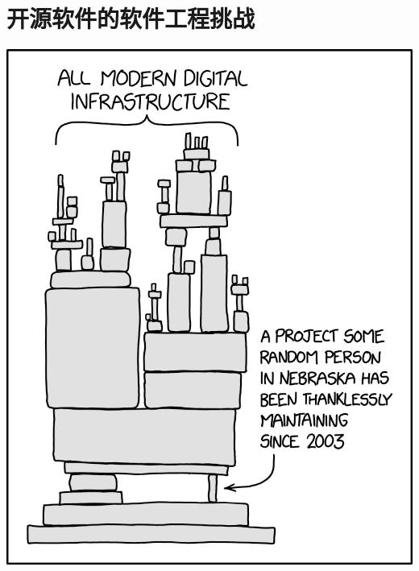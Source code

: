 \documentclass{beamer}
\begin{document}
\section{开源软件的软件工程挑战}
\label{sec:orgd101a9b}
\begin{frame}[label={sec:org5e725f7}]{}
\begin{center}
\includegraphics[height=\textheight]{../assets/static/opensource/fragile.png}
\end{center}
\end{frame}
\end{document}
